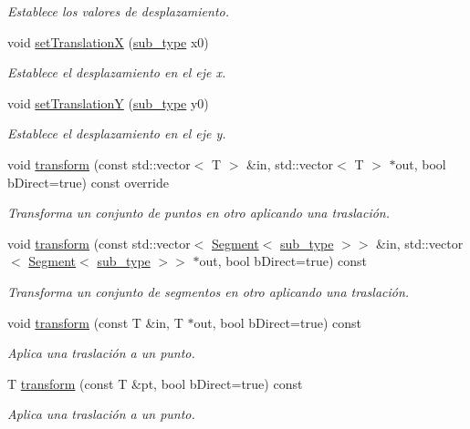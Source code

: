 \begin{DoxyCompactItemize}
\begin{DoxyCompactList}\small\item\em Establece los valores de desplazamiento. \end{DoxyCompactList}\item 
void \hyperlink{group__trf2_d_group_gaa4a82205fd57f86aed9338054104a22f}{set\+TranslationX} (\hyperlink{class_i3_d_1_1_transform_ac087b4b8b9acb1b11a6caa2231d598c7}{sub\+\_\+type} x0)
\begin{DoxyCompactList}\small\item\em Establece el desplazamiento en el eje x. \end{DoxyCompactList}\item 
void \hyperlink{group__trf2_d_group_gaed6d19903cf0da2cd1ced22381ec223b}{set\+TranslationY} (\hyperlink{class_i3_d_1_1_transform_ac087b4b8b9acb1b11a6caa2231d598c7}{sub\+\_\+type} y0)
\begin{DoxyCompactList}\small\item\em Establece el desplazamiento en el eje y. \end{DoxyCompactList}\item 
void \hyperlink{group__trf2_d_group_ga1e3ba2120da67c8c4606681c4b82f709}{transform} (const std\+::vector$<$ T $>$ \&in, std\+::vector$<$ T $>$ $\ast$out, bool b\+Direct=true) const  override
\begin{DoxyCompactList}\small\item\em Transforma un conjunto de puntos en otro aplicando una traslación. \end{DoxyCompactList}\item 
void \hyperlink{group__trf2_d_group_ga8be3570501a8efb7a67210bb24d5218c}{transform} (const std\+::vector$<$ \hyperlink{class_i3_d_1_1_segment}{Segment}$<$ \hyperlink{class_i3_d_1_1_transform_ac087b4b8b9acb1b11a6caa2231d598c7}{sub\+\_\+type} $>$$>$ \&in, std\+::vector$<$ \hyperlink{class_i3_d_1_1_segment}{Segment}$<$ \hyperlink{class_i3_d_1_1_transform_ac087b4b8b9acb1b11a6caa2231d598c7}{sub\+\_\+type} $>$$>$ $\ast$out, bool b\+Direct=true) const 
\begin{DoxyCompactList}\small\item\em Transforma un conjunto de segmentos en otro aplicando una traslación. \end{DoxyCompactList}\item 
void \hyperlink{group__trf2_d_group_ga2f30e8ab65a36498c27994e2887deb80}{transform} (const T \&in, T $\ast$out, bool b\+Direct=true) const 
\begin{DoxyCompactList}\small\item\em Aplica una traslación a un punto. \end{DoxyCompactList}\item 
T \hyperlink{group__trf2_d_group_gafdec629c6bb3f71d71934c43d4a54b74}{transform} (const T \&pt, bool b\+Direct=true) const 
\begin{DoxyCompactList}\small\item\em Aplica una traslación a un punto. \end{DoxyCompactList}\end{DoxyCompactItemize}
